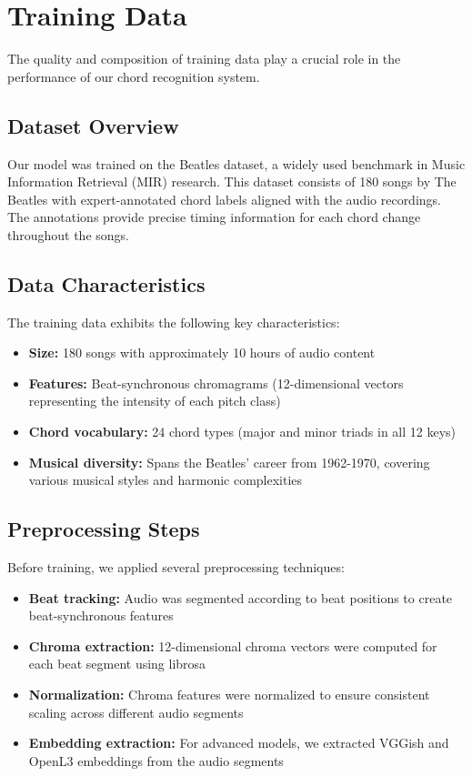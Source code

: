 \documentclass{article}
\begin{document}
\section{Training Data}
\label{sec:training_data}

The quality and composition of training data play a crucial role in the performance of our chord recognition system.

\subsection{Dataset Overview}
Our model was trained on the Beatles dataset, a widely used benchmark in Music Information Retrieval (MIR) research. This dataset consists of 180 songs by The Beatles with expert-annotated chord labels aligned with the audio recordings. The annotations provide precise timing information for each chord change throughout the songs.

\subsection{Data Characteristics}
The training data exhibits the following key characteristics:
\begin{itemize}
    \item \textbf{Size:} 180 songs with approximately 10 hours of audio content
    \item \textbf{Features:} Beat-synchronous chromagrams (12-dimensional vectors representing 
      the intensity of each pitch class)
    \item \textbf{Chord vocabulary:} 24 chord types (major and minor triads in all 12 keys)
    \item \textbf{Musical diversity:} Spans the Beatles' career from 1962-1970, covering various 
      musical styles and harmonic complexities
\end{itemize}

\subsection{Preprocessing Steps}
Before training, we applied several preprocessing techniques:
\begin{itemize}
    \item \textbf{Beat tracking:} Audio was segmented according to beat positions to create 
      beat-synchronous features
    \item \textbf{Chroma extraction:} 12-dimensional chroma vectors were computed for each beat 
      segment using librosa
    \item \textbf{Normalization:} Chroma features were normalized to ensure consistent scaling 
      across different audio segments
    \item \textbf{Embedding extraction:} For advanced models, we extracted VGGish and OpenL3 
      embeddings from the audio segments
\end{itemize}
\end{document}
